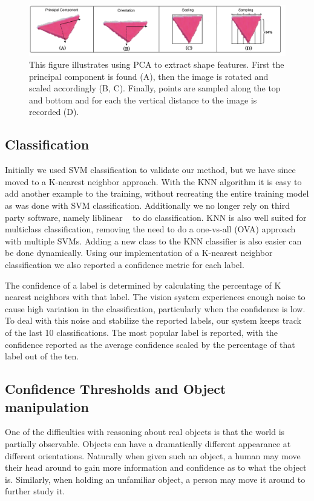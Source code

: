 \documentclass[11pt]{article}
\begin{document}
\begin{figure}[h!]
\centering
    \includegraphics[width=1.0\textwidth]{figures/PCA_example.png}
    \caption{This figure illustrates using PCA to extract shape features. First the principal component is found (A), then the image is rotated and scaled accordingly (B, C). Finally, points are sampled along the top and bottom and for each the vertical distance to the image is recorded (D).}
    \label{fig:pca}
\end{figure}

\subsection{Classification}
Initially we used SVM classification to validate our method, but we have since
moved to a K-nearest neighbor approach.  With the KNN algorithm
it is easy to add another example to the training, without recreating the
entire training model as was done with SVM classification.  Additionally we no
longer rely on third party software, namely liblinear ~\cite{LIBLINEAR} to do
classification. KNN is also well suited for multiclass classification, removing
the need to do a one-vs-all (OVA) approach with multiple SVMs.  Adding a new
class to the KNN classifier is also easier can be done dynamically. Using our
implementation of a K-nearest neighbor
classification we also reported a confidence metric for each label.

The confidence of a label is determined by calculating the percentage of K
nearest neighbors with that label.  The vision system experiences enough noise
to cause high variation in the classification, particularly when the
confidence is low.  To deal with this noise and stabilize the reported labels,
our system keeps track of the last 10 classifications.  The most popular label
is reported, with the confidence reported as the average confidence scaled by
the percentage of that label out of the ten.


\subsection{Confidence Thresholds and Object manipulation}
One of the difficulties with reasoning about real objects is that the world is
partially observable. Objects can have a dramatically different appearance at
different orientations. Naturally when given such an object, a human may move
their head around to gain more information and confidence as to what the object
is.  Similarly, when holding an unfamiliar object, a person may move it around
to further study it.
\end{document}
